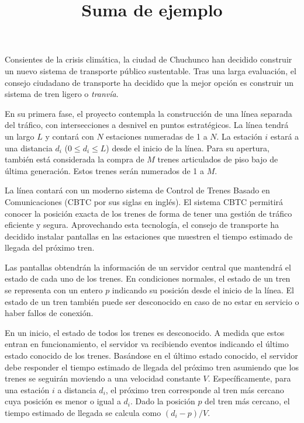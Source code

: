 \documentclass{oci}
\title{Suma de ejemplo}
\begin{document}
\begin{problemDescription}
  Consientes de la crisis climática, la ciudad de Chuchunco
  han decidido construir un nuevo sistema de transporte
  público sustentable.
  Tras una larga evaluación, el consejo ciudadano de
  transporte ha decidido que la mejor opción es construir un
  sistema de tren ligero o \emph{tranvía}.

  En su primera fase, el proyecto contempla la
  construcción de una línea separada del tráfico, con
  intersecciones a desnivel en puntos estratégicos.
  La línea tendrá un largo $L$ y contará con $N$
  estaciones numeradas de 1 a $N$.
  La estación $i$ estará a una distancia $d_i$
  ($0 \leq d_i \leq L$) desde el inicio de la línea.
  Para su apertura, también está considerada la
  compra de $M$ trenes articulados de piso bajo
  de última generación.
  Estos trenes serán numerados de 1 a $M$.

  La línea contará con un moderno sistema de
  Control de Trenes Basado en Comunicaciones
  (CBTC por sus siglas en inglés).
  El sistema CBTC permitirá conocer la posición
  exacta de los trenes de forma de tener una
  gestión de tráfico eficiente y segura.
  Aprovechando esta tecnología, el consejo de
  transporte ha decidido instalar pantallas en las
  estaciones que muestren el tiempo estimado de
  llegada del próximo tren.

  Las pantallas obtendrán la información de un
  servidor central que mantendrá el estado
  de cada uno de los trenes.
  En condiciones normales, el estado de un tren
  se representa con un entero $p$ indicando
  su posición desde el inicio de la línea.
  El estado de un tren también puede ser desconocido
  en caso de no estar en servicio o haber fallos
  de conexión.

  En un inicio, el estado de todos los trenes es
  desconocido.
  A medida que estos entran en funcionamiento, el
  servidor va recibiendo eventos indicando el
  último estado conocido de los trenes.
  Basándose en el último estado conocido, el servidor
  debe responder el tiempo estimado de llegada del
  próximo tren asumiendo que los trenes se seguirán
  moviendo a una velocidad constante $V$.
  Específicamente, para una estación $i$ a distancia $d_i$,
  el próximo tren corresponde al tren más cercano
  cuya posición es menor o igual a $d_i$.
  Dado la posición $p$ del tren más cercano, el tiempo estimado
  de llegada se calcula como $(d_i - p)/V$.


\end{problemDescription}
\end{document}

